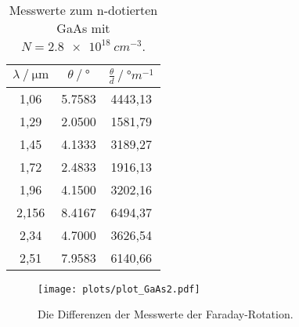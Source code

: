 \begin{table}
  \centering
  \caption{Messwerte zum n-dotierten GaAs mit $N = \SI{2.8e18}{cm^{-3}}$.}
  \label{tab:rein}
  \begin{tabular}{S[table-format=1.3] S[table-format=2.4] S[table-format=4.2]}
    \toprule
    {$\lambda\:/\:\si{\micro\meter}$} & {$\theta\:/\:\si{\degree}$} & {$\frac{\theta}{d}\:/\:\si{\degree m^{-1}}$} \\
    ,06  & 5.7583 & 4443,13 \\
    1,29  & 2.0500 & 1581,79 \\
    1,45  & 4.1333 & 3189,27 \\
    1,72  & 2.4833 & 1916,13 \\
    1,96  & 4.1500 & 3202,16 \\
    2,156 & 8.4167 & 6494,37 \\
    2,34  & 4.7000 & 3626,54 \\
    2,51  & 7.9583 & 6140,66 \\
    \bottomrule
  \end{tabular}
\end{table}


\begin{figure}
  \centering
  \texttt{[image: plots/plot\_GaAs2.pdf]}
  \caption{Die Differenzen der Messwerte der Faraday-Rotation.}
  \label{fig:GaAs2}
\end{figure}
